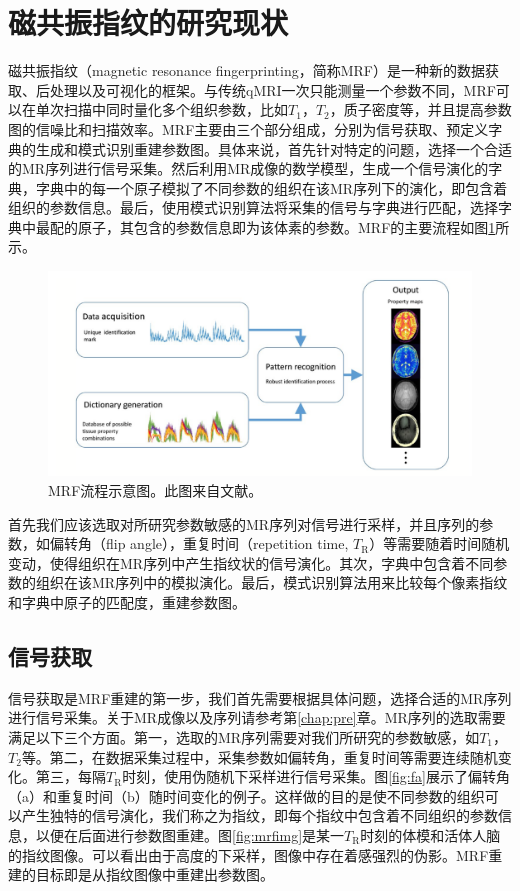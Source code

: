 \section{磁共振指纹的研究现状}
\label{sec:mrf}
磁共振指纹（magnetic resonance fingerprinting，简称MRF）是一种新的数据获取、后处理以及可视化的框架。与传统qMRI一次只能测量一个参数不同，MRF可以在单次扫描中同时量化多个组织参数，比如$T_1$，$T_2$，质子密度等，并且提高参数图的信噪比和扫描效率。MRF主要由三个部分组成，分别为信号获取、预定义字典的生成和模式识别重建参数图。具体来说，首先针对特定的问题，选择一个合适的MR序列进行信号采集。然后利用MR成像的数学模型，生成一个信号演化的字典，字典中的每一个原子模拟了不同参数的组织在该MR序列下的演化，即包含着组织的参数信息。最后，使用模式识别算法将采集的信号与字典进行匹配，选择字典中最配的原子，其包含的参数信息即为该体素的参数。MRF的主要流程如图\ref{fig:mrf}所示。
\begin{figure}[htbp]
\centerline{\includegraphics[width=1\textwidth]{img/intro/mrf.png}}
\caption{
MRF流程示意图。此图来自文献\cite{mrfreview}。
}
\label{fig:mrf}
\end{figure}
首先我们应该选取对所研究参数敏感的MR序列对信号进行采样，并且序列的参数，如偏转角（flip angle），重复时间（repetition time, $T_\mathrm{R}$）等需要随着时间随机变动，使得组织在MR序列中产生指纹状的信号演化。其次，字典中包含着不同参数的组织在该MR序列中的模拟演化。最后，模式识别算法用来比较每个像素指纹和字典中原子的匹配度，重建参数图。

\subsection{信号获取}
信号获取是MRF重建的第一步，我们首先需要根据具体问题，选择合适的MR序列进行信号采集。关于MR成像以及序列请参考第\ref{chap:pre}章。MR序列的选取需要满足以下三个方面。第一，选取的MR序列需要对我们所研究的参数敏感，如$T_1$，$T_2$等。第二，在数据采集过程中，采集参数如偏转角，重复时间等需要连续随机变化。第三，每隔$T_\mathrm{R}$时刻，使用伪随机下采样进行信号采集。图\ref{fig:fa}展示了偏转角（a）和重复时间（b）随时间变化的例子。这样做的目的是使不同参数的组织可以产生独特的信号演化，我们称之为指纹，即每个指纹中包含着不同组织的参数信息，以便在后面进行参数图重建。图\ref{fig:mrfimg}是某一$T_\mathrm{R}$时刻的体模和活体人脑的指纹图像。可以看出由于高度的下采样，图像中存在着感强烈的伪影。MRF重建的目标即是从指纹图像中重建出参数图。


